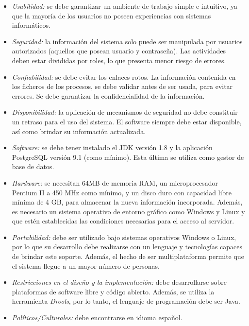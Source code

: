 \begin{itemize}
\item \textsl{Usabilidad:} se debe garantizar un ambiente de trabajo simple e intuitivo, ya que la mayoría de los usuarios no poseen experiencias con sistemas informáticos.
\item \textsl{Seguridad:} la información del sistema solo puede ser manipulada por usuarios autorizados (aquellos que posean usuario y contraseña). Las actividades deben estar divididas por roles, lo que presenta menor riesgo de errores.
\item \textsl{Confiabilidad:} se debe evitar los enlaces rotos. La información contenida en los ficheros de los procesos, se debe validar antes de ser usada, para evitar errores. Se debe garantizar la confidencialidad de la información.
\item \textsl{Disponibilidad:} la aplicación de mecanismos de seguridad no debe constituir un retraso para el uso del sistema. El software siempre debe estar disponible, así como brindar su información actualizada.
\item \textsl{Software:} se debe tener instalado el JDK versión 1.8 y la aplicación PostgreSQL versión 9.1 (como mínimo). Esta última se utiliza como gestor de base de datos.
\item \textsl{Hardware:} se necesitan 64MB de memoria RAM, un microprocesador Pentium II a 450 MHz como mínimo, y un disco duro con capacidad libre mínima de 4 GB, para almacenar la nueva información incorporada. Además, es necesario un sistema operativo de entorno gráfico como Windows y Linux y que estén establecidas las condiciones necesarias para el acceso al servidor.
\item \textsl{Portabilidad:} debe ser utilizado bajo sistemas operativos Windows o Linux, por lo que su desarrollo debe realizarse con un lenguaje y tecnologías capaces de brindar este soporte. Además, el hecho de ser multiplataforma permite que el sistema llegue a un mayor número de personas. 
\item \textsl{Restricciones en el diseño y la implementación:} debe desarrollarse sobre plataformas de software libre y código abierto. Además, se utiliza la herramienta \textsl{Drools}, por lo tanto, el lenguaje de programación debe ser Java.
\item \textsl{Políticos/Culturales:} debe encontrarse en idioma español.
\end{itemize}


